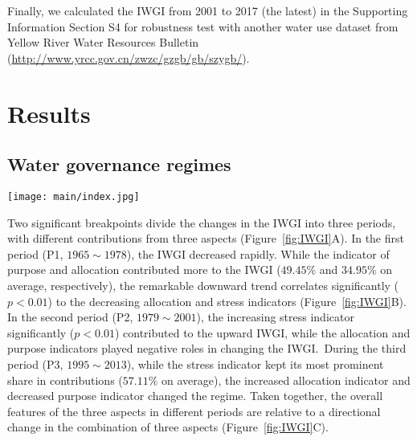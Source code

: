 \documentclass[draft]{../agujournal2019}
\begin{document}
	Finally, we calculated the IWGI from 2001 to 2017 (the latest) in the Supporting Information Section S4 for robustness test with another water use dataset from Yellow River Water Resources Bulletin (\url{http://www.yrcc.gov.cn/zwzc/gzgb/gb/szygb/}).
 \section{Results}\label{sec2}
\subsection{Water governance regimes}\label{Res.1}

\begin{figure*}[ht!]
	\centering
	\texttt{[image: main/index.jpg]}
	\caption{Changes in the IWGI index and corresponding water governance regimes: P1: $1965 \sim 1978$, P2: $1979 \sim 2001$, and P3: $2002 \sim 2013$.
	\textbf{A,} detecting change points of IWGI and contributions from each indicator. Two significant change points ($p<0.001$) occurred in 1978 and 2001.
	\textbf{B,} correlation of trends between the IWGI and the indicators.
	\textbf{C,} across three indicators, changing components of the IWGI, whose directions shifts between different regimes.
	}\label{fig:IWGI}
\end{figure*}

Two significant breakpoints divide the changes in the IWGI into three periods, with different contributions from three aspects (Figure~\ref{fig:IWGI}A).
In the first period (P1, $1965 \sim 1978$), the IWGI decreased rapidly.
While the indicator of purpose and allocation contributed more to the IWGI ($49.45\%$ and $34.95\%$ on average, respectively), the remarkable downward trend correlates significantly ($p<0.01$) to the decreasing allocation and stress indicators (Figure~\ref{fig:IWGI}B).
In the second period (P2, $1979 \sim 2001$), the increasing stress indicator significantly ($p<0.01$) contributed to the upward IWGI, while the allocation and purpose indicators played negative roles in changing the IWGI.\
During the third period (P3, $1995 \sim 2013$), while the stress indicator kept its most prominent share in contributions ($57.11\%$ on average), the increased allocation indicator and decreased purpose indicator changed the regime.
Taken together, the overall features of the three aspects in different periods are relative to a directional change in the combination of three aspects (Figure~\ref{fig:IWGI}C).
\end{document}
